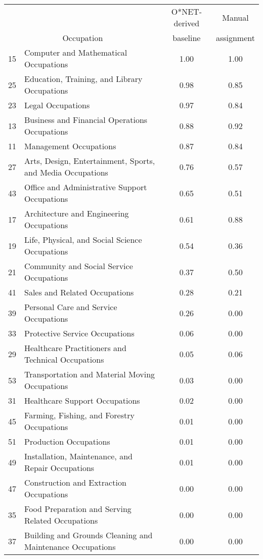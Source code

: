 \begin{tabular}{llcc} \toprule
&&O*NET-derived & Manual\\
\multicolumn{2}{c}{Occupation} & baseline & assignment\\
\midrule
15&Computer and Mathematical Occupations&1.00&1.00\\
25&Education, Training, and Library Occupations&0.98&0.85\\
23&Legal Occupations&0.97&0.84\\
13&Business and Financial Operations Occupations&0.88&0.92\\
11&Management Occupations&0.87&0.84\\
27&Arts, Design, Entertainment, Sports, and Media Occupations&0.76&0.57\\
43&Office and Administrative Support Occupations&0.65&0.51\\
17&Architecture and Engineering Occupations&0.61&0.88\\
19&Life, Physical, and Social Science Occupations&0.54&0.36\\
21&Community and Social Service Occupations&0.37&0.50\\
41&Sales and Related Occupations&0.28&0.21\\
39&Personal Care and Service Occupations&0.26&0.00\\
33&Protective Service Occupations&0.06&0.00\\
29&Healthcare Practitioners and Technical Occupations&0.05&0.06\\
53&Transportation and Material Moving Occupations&0.03&0.00\\
31&Healthcare Support Occupations&0.02&0.00\\
45&Farming, Fishing, and Forestry Occupations&0.01&0.00\\
51&Production Occupations&0.01&0.00\\
49&Installation, Maintenance, and Repair Occupations&0.01&0.00\\
47&Construction and Extraction Occupations&0.00&0.00\\
35&Food Preparation and Serving Related Occupations&0.00&0.00\\
37&Building and Grounds Cleaning and Maintenance Occupations&0.00&0.00\\
\bottomrule \end{tabular}
